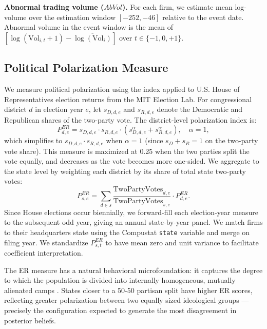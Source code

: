 \textbf{Abnormal trading volume ($AbVol$).} For each firm, we estimate mean
log-volume over the estimation window $[-252, -46]$ relative to the event
date. Abnormal volume in the event window is the mean of
$[\log(\text{Vol}_{i,t} + 1) - \overline{\log(\text{Vol}_i)}]$ over
$t \in \{-1, 0, +1\}$.

\subsection{Political Polarization Measure}

We measure political polarization using the \citet{esteban1994} index applied
to U.S. House of Representatives election returns from the MIT Election Lab.
For congressional district $d$ in election year $e$, let $s_{D,d,e}$ and
$s_{R,d,e}$ denote the Democratic and Republican shares of the two-party vote.
The district-level polarization index is:
\begin{equation}
    \label{eq:er}
    P^{ER}_{d,e} = s_{D,d,e} \cdot s_{R,d,e}
    \cdot \left(s_{D,d,e}^\alpha + s_{R,d,e}^\alpha\right),
    \quad \alpha = 1,
\end{equation}
which simplifies to $s_{D,d,e} \cdot s_{R,d,e}$ when $\alpha = 1$ (since
$s_D + s_R = 1$ on the two-party vote share). This measure is maximized at
0.25 when the two parties split the vote equally, and decreases as the vote
becomes more one-sided. We aggregate to the state level by weighting each
district by its share of total state two-party votes:
\begin{equation}
    P^{ER}_{s,e} = \sum_{d \in s}
    \frac{\text{TwoPartyVotes}_{d,e}}{\text{TwoPartyVotes}_{s,e}}
    \cdot P^{ER}_{d,e}.
\end{equation}
Since House elections occur biennially, we forward-fill each election-year
measure to the subsequent odd year, giving an annual state-by-year panel.
We match firms to their headquarters state using the Compustat \texttt{state}
variable and merge on filing year. We standardize $P^{ER}_{s,t}$ to have
mean zero and unit variance to facilitate coefficient interpretation.

The ER measure has a natural behavioral microfoundation: it captures the
degree to which the population is divided into internally homogeneous,
mutually alienated camps \citep{esteban1994}. States closer to a 50-50
partisan split have higher ER scores, reflecting greater polarization between
two equally sized ideological groups — precisely the configuration expected to
generate the most disagreement in posterior beliefs.

